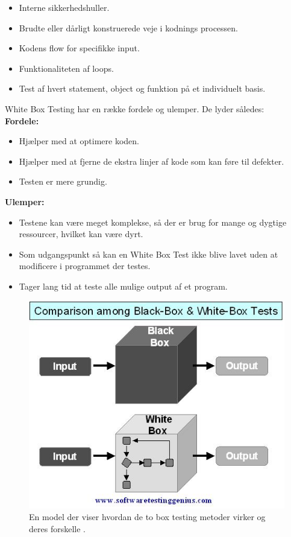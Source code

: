 \begin{itemize}
\item{Interne sikkerhedshuller.}
\item{Brudte eller dårligt konstruerede veje i kodnings processen.}
\item{Kodens flow for specifikke input.}
\item{Funktionaliteten af loops.}
\item{Test af hvert statement, object og funktion på et individuelt basis.}
\end{itemize}

White Box Testing har en række fordele og ulemper. De lyder således:\\

\textbf{Fordele:}

\begin{itemize}
\item{Hjælper med at optimere koden.}
\item{Hjælper med at fjerne de ekstra linjer af kode som kan føre til defekter.}
\item{Testen er mere grundig.}
\end{itemize}
\citep{Prasad2008}

\textbf{Ulemper:}

\begin{itemize}
\item{Testene kan være meget komplekse, så der er brug for mange og dygtige ressourcer, hvilket kan være dyrt.}
\item{Som udgangspunkt så kan en White Box Test ikke blive lavet uden at modificere i programmet der testes.}
\item{Tager lang tid at teste alle mulige output af et program.}
\end{itemize}
\citep{Prasad2008}
\citep{Fundamentals2010White}

\begin{figure}[H]
\centering
\includegraphics[scale=0.75]{figures/blackwhite.PNG}
\caption{En model der viser hvordan de to box testing metoder virker og deres forskelle \citep{Genius2015}.}
\label{fig:blackwhite}
\end{figure}

